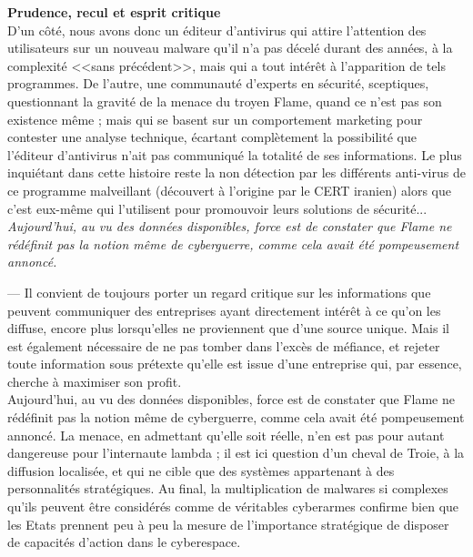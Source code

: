 \documentclass[11pt,twoside,a4paper]{article}
\begin{document}
\textbf{\large Prudence, recul et esprit critique}~\\

D'un c{\^o}t{\'e}, nous avons donc un {\'e}diteur d'antivirus qui attire l'attention des utilisateurs sur un nouveau malware qu'il n'a pas d{\'e}cel{\'e} durant des ann{\'e}es, {\`a} la complexit{\'e} <<sans pr{\'e}c{\'e}dent>>, mais qui a tout int{\'e}r{\^e}t {\`a} l'apparition de tels programmes. De l'autre, une communaut{\'e} d'experts en s{\'e}curit{\'e}, sceptiques, questionnant la gravit{\'e} de la menace du troyen Flame, quand ce n'est pas son existence m{\^e}me ; mais qui se basent sur un comportement marketing pour contester une analyse technique, {\'e}cartant compl{\`e}tement la possibilit{\'e} que l'{\'e}diteur d'antivirus n'ait pas communiqu{\'e} la totalit{\'e} de ses informations. Le plus inqui{\'e}tant dans cette histoire reste la non d{\'e}tection par les diff{\'e}rents anti-virus de ce programme malveillant (d{\'e}couvert {\`a} l'origine par le CERT iranien) alors que c'est eux-m{\^e}me qui l'utilisent pour promouvoir leurs solutions de s{\'e}curit{\'e}...~\\

\emph{Aujourd'hui, au vu des donn{\'e}es disponibles, force est de constater que Flame ne r{\'e}d{\'e}finit pas la notion m{\^e}me de cyberguerre, comme cela avait {\'e}t{\'e} pompeusement annonc{\'e}.} %

--- Il convient de toujours porter un regard critique sur les informations que peuvent communiquer des entreprises ayant directement int{\'e}r{\^e}t {\`a} ce qu'on les diffuse, encore plus lorsqu'elles ne proviennent que d'une source unique. Mais il est {\'e}galement n{\'e}cessaire de ne pas tomber dans l'exc{\`e}s de m{\'e}fiance, et rejeter toute information sous pr{\'e}texte qu'elle est issue d'une entreprise qui, par essence, cherche {\`a} maximiser son profit.~\\

Aujourd'hui, au vu des donn{\'e}es disponibles, force est de constater que Flame ne r{\'e}d{\'e}finit pas la notion m{\^e}me de cyberguerre, comme cela avait {\'e}t{\'e} pompeusement annonc{\'e}. La menace, en admettant qu'elle soit r{\'e}elle, n'en est pas pour autant dangereuse pour l'internaute lambda ; il est ici question d'un cheval de Troie, {\`a} la diffusion localis{\'e}e, et qui ne cible que des syst{\`e}mes appartenant {\`a} des personnalit{\'e}s strat{\'e}giques. Au final, la multiplication de malwares si complexes qu'ils peuvent {\^e}tre consid{\'e}r{\'e}s comme de v{\'e}ritables cyberarmes confirme bien que les Etats prennent peu {\`a} peu la mesure de l'importance strat{\'e}gique de disposer de capacit{\'e}s d'action dans le cyberespace.~\\
\end{document}

